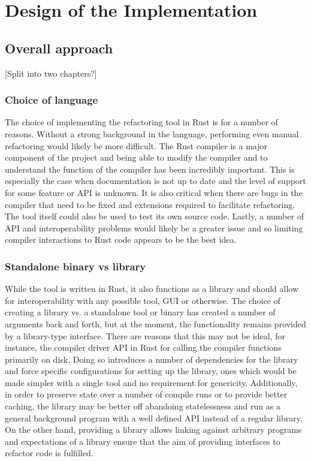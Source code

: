 \chapter{Design of the Implementation}\label{C:wd}

\section{Overall approach}


[Split into two chapters?]

\subsection{Choice of language}
The choice of implementing the refactoring tool in Rust is for a number of reasons. Without a strong background in the language, performing even manual refactoring would likely be more difficult. The Rust compiler is a major component of the project and being able to modify the compiler and to understand the function of the compiler has been incredibly important. This is especially the case when documentation is not up to date and the level of support for some feature or API is unknown. It is also critical when there are bugs in the compiler that need to be fixed and extensions required to facilitate refactoring. The tool itself could also be used to test its own source code. Lastly, a number of API and interoperability problems would likely be a greater issue and so limiting compiler interactions to Rust code appears to be the best idea. 

\subsection{Standalone binary vs library}
While the tool is written in Rust, it also functions as a library and should allow for interoperability with any possible tool, GUI or otherwise. The choice of creating a library vs. a standalone tool or binary has created a number of arguments back and forth, but at the moment, the functionality remains provided by a library-type interface. There are reasons that this may not be ideal, for instance, the compiler driver API in Rust for calling the compiler functions primarily on disk. Doing so introduces a number of dependencies for the library and force specific configurations for setting up the library, ones which would be made simpler with a single tool and no requirement for genericity. Additionally, in order to preserve state over a number of compile runs or to provide better caching, the library may be better off abandoing statelessness and run as a general background program with a well defined API instead of a regular library. On the other hand, providing a library allows linking against arbitrary programs and expectations of a library ensure that the aim of providing interfaces to refactor code is fulfilled.

